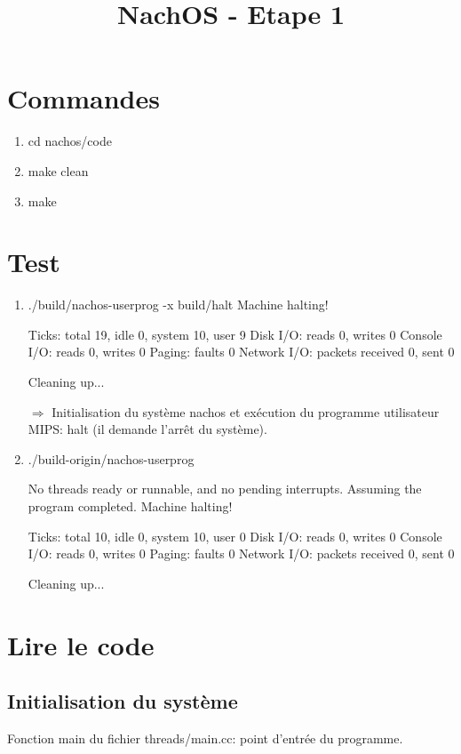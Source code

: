 \documentclass[a4paper,10pt]{article}
\title{NachOS - Etape 1}
\author{}
\date{}
\begin{document}
\maketitle


\section{Commandes}

\begin{enumerate}
 \item cd nachos/code
 \item make clean
 \item make
\end{enumerate}

\section{Test}

\begin{enumerate}
 \item ./build/nachos-userprog -x build/halt
Machine halting!

Ticks: total 19, idle 0, system 10, user 9
Disk I/O: reads 0, writes 0
Console I/O: reads 0, writes 0
Paging: faults 0
Network I/O: packets received 0, sent 0

Cleaning up...

$\Longrightarrow$ Initialisation du système nachos et exécution du 
programme utilisateur MIPS: halt (il demande l'arrêt du système).
 
 \item  ./build-origin/nachos-userprog

No threads ready or runnable, and no pending interrupts.
Assuming the program completed.
Machine halting!

Ticks: total 10, idle 0, system 10, user 0
Disk I/O: reads 0, writes 0
Console I/O: reads 0, writes 0
Paging: faults 0
Network I/O: packets received 0, sent 0

Cleaning up...

\end{enumerate}

\section{Lire le code}

\subsection{Initialisation du système}
Fonction main du fichier threads/main.cc: point d'entrée du programme.
\end{document}
